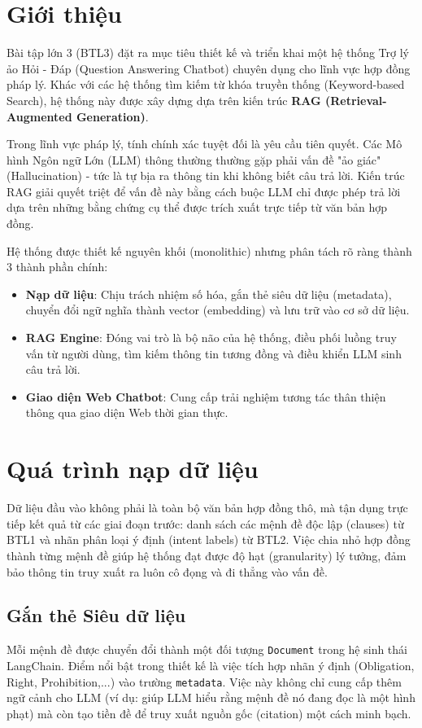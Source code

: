 \section{Giới thiệu}
Bài tập lớn 3 (BTL3) đặt ra mục tiêu thiết kế và triển khai một hệ thống Trợ lý ảo Hỏi - Đáp (Question Answering Chatbot) chuyên dụng cho lĩnh vực hợp đồng pháp lý. Khác với các hệ thống tìm kiếm từ khóa truyền thống (Keyword-based Search), hệ thống này được xây dựng dựa trên kiến trúc \textbf{RAG (Retrieval-Augmented Generation)}.

Trong lĩnh vực pháp lý, tính chính xác tuyệt đối là yêu cầu tiên quyết. Các Mô hình Ngôn ngữ Lớn (LLM) thông thường thường gặp phải vấn đề "ảo giác" (Hallucination) - tức là tự bịa ra thông tin khi không biết câu trả lời. Kiến trúc RAG giải quyết triệt để vấn đề này bằng cách buộc LLM chỉ được phép trả lời dựa trên những bằng chứng cụ thể được trích xuất trực tiếp từ văn bản hợp đồng.

Hệ thống được thiết kế nguyên khối (monolithic) nhưng phân tách rõ ràng thành 3 thành phần chính:
\begin{itemize}
    \item \textbf{Nạp dữ liệu}: Chịu trách nhiệm số hóa, gắn thẻ siêu dữ liệu (metadata), chuyển đổi ngữ nghĩa thành vector (embedding) và lưu trữ vào cơ sở dữ liệu.
    \item \textbf{RAG Engine}: Đóng vai trò là bộ não của hệ thống, điều phối luồng truy vấn từ người dùng, tìm kiếm thông tin tương đồng và điều khiển LLM sinh câu trả lời.
    \item \textbf{Giao diện Web Chatbot}: Cung cấp trải nghiệm tương tác thân thiện thông qua giao diện Web thời gian thực.
\end{itemize}

\section{Quá trình nạp dữ liệu}
Dữ liệu đầu vào không phải là toàn bộ văn bản hợp đồng thô, mà tận dụng trực tiếp kết quả từ các giai đoạn trước: danh sách các mệnh đề độc lập (clauses) từ BTL1 và nhãn phân loại ý định (intent labels) từ BTL2. Việc chia nhỏ hợp đồng thành từng mệnh đề giúp hệ thống đạt được độ hạt (granularity) lý tưởng, đảm bảo thông tin truy xuất ra luôn cô đọng và đi thẳng vào vấn đề.

\subsection{Gắn thẻ Siêu dữ liệu}
Mỗi mệnh đề được chuyển đổi thành một đối tượng \texttt{Document} trong hệ sinh thái LangChain. Điểm nổi bật trong thiết kế là việc tích hợp nhãn ý định (Obligation, Right, Prohibition,...) vào trường \texttt{metadata}. Việc này không chỉ cung cấp thêm ngữ cảnh cho LLM (ví dụ: giúp LLM hiểu rằng mệnh đề nó đang đọc là một hình phạt) mà còn tạo tiền đề để truy xuất nguồn gốc (citation) một cách minh bạch.

